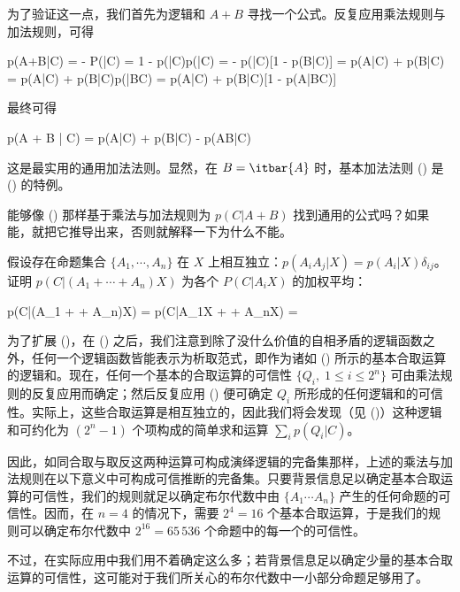 为了验证这一点，我们首先为逻辑和 $A + B$ 寻找一个公式。反复应用乘法规则与加法规则，可得

\placeformula[2-65]
\startformula
\startmathmatrix[align={middle, middle, left}]
\NC p(A+B|C) \NC =  - P(|C) = 1 - p(|C)p(|C)\NR
\NC \NC =  - p(|C)[1 - p(B|C)] = p(A|C) + p(B|C)\NR
\NC \NC = \NC p(A|C) + p(B|C)p(|BC) = p(A|C) + p(B|C)[1 - p(A|BC)]\NR
\stopmathmatrix
\stopformula

最终可得

\placeformula[2-66]
\startformula
p(A + B | C) = p(A|C) + p(B|C) - p(AB|C)
\stopformula

这是最实用的通用加法法则。显然，在 $B = \itbar{A}$ 时，基本加法法则 (\in[2-64]) 是 (\in[2-66]) 的特例。

\startframedtext[width=broad]
\exercise{} 能够像 (\in[2-66]) 那样基于乘法与加法规则为 $p(C|A + B)$ 找到通用的公式吗？如果能，就把它推导出来，否则就解释一下为什么不能。
\stopframedtext

\startframedtext[width=broad]
\exercise{} 假设存在命题集合 $\{A_1,\cdots,A_n\}$ 在 $X$ 上相互独立：$p(A_iA_j|X) = p(A_i|X)\delta_{ij}$。证明 $p(C|(A_1 + \cdots + A_n)X)$ 为各个 $P(C|A_iX)$ 的加权平均：

\placeformula[2-67]
\startformula
p(C|(A_1 + \cdots + A_n)X) = p(C|A_1X + \cdots + A_nX) = 
\stopformula
\stopframedtext

为了扩展 (\in[2-66])，在 (\in[1-17]) 之后，我们注意到除了没什么价值的自相矛盾的逻辑函数之外，任何一个逻辑函数皆能表示为析取范式，即作为诸如 (\in[1-17]) 所示的基本合取运算的逻辑和。现在，任何一个基本的合取运算的可信性 $\{Q_i,\; 1\le i \le 2^n\}$ 可由乘法规则的反复应用而确定；然后反复应用 (\in[2-66]) 便可确定 $Q_i$ 所形成的任何逻辑和的可信性。实际上，这些合取运算是相互独立的，因此我们将会发现（见 (\in[2-85])）这种逻辑和可约化为 $(2^n - 1)$ 个项构成的简单求和运算 $\sum_ip(Q_i|C)$。

因此，如同合取与取反这两种运算可构成演绎逻辑的完备集那样，上述的乘法与加法规则在以下意义中可构成可信推断的完备集。只要背景信息足以确定基本合取运算的可信性，我们的规则就足以确定布尔代数中由 $\{A_1\cdots A_n\}$ 产生的任何命题的可信性。因而，在 $n = 4$ 的情况下，需要 $2^4 = 16$ 个基本合取运算，于是我们的规则可以确定布尔代数中 $2^{16} = 65\,536$ 个命题中的每一个的可信性。

不过，在实际应用中我们用不着确定这么多；若背景信息足以确定少量的基本合取运算的可信性，这可能对于我们所关心的布尔代数中一小部分命题足够用了。

